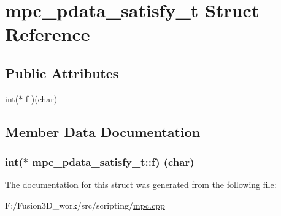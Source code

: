 \hypertarget{structmpc__pdata__satisfy__t}{}\section{mpc\+\_\+pdata\+\_\+satisfy\+\_\+t Struct Reference}
\label{structmpc__pdata__satisfy__t}
\subsection*{Public Attributes}
\begin{DoxyCompactItemize}
\item 
int($\ast$ \hyperlink{structmpc__pdata__satisfy__t_a54cbd775b28da07d7d449fc8f1f9a8b2}{f} )(char)
\end{DoxyCompactItemize}


\subsection{Member Data Documentation}
\hypertarget{structmpc__pdata__satisfy__t_a54cbd775b28da07d7d449fc8f1f9a8b2}{}
\subsubsection[{f}]{\setlength{\rightskip}{0pt plus 5cm}int($\ast$ mpc\+\_\+pdata\+\_\+satisfy\+\_\+t\+::f) (char)}\label{structmpc__pdata__satisfy__t_a54cbd775b28da07d7d449fc8f1f9a8b2}


The documentation for this struct was generated from the following file\+:\begin{DoxyCompactItemize}
\item 
F\+:/\+Fusion3\+D\+\_\+work/src/scripting/\hyperlink{mpc_8cpp}{mpc.\+cpp}\end{DoxyCompactItemize}
